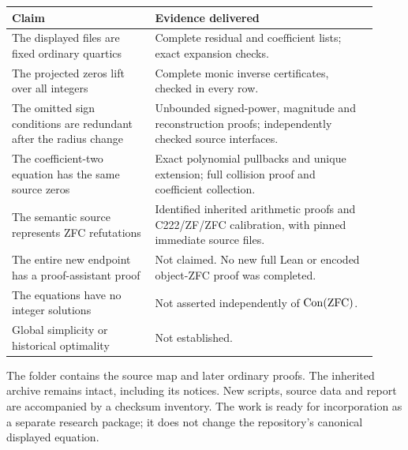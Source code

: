 \begin{center}\small
\begin{tabular}{p{0.36\linewidth}p{0.56\linewidth}}
\toprule
Claim & Evidence delivered\\
\midrule
The displayed files are fixed ordinary quartics & Complete residual and coefficient lists; exact expansion checks.\\
The projected zeros lift over all integers & Complete monic inverse certificates, checked in every row.\\
The omitted sign conditions are redundant after the radius change & Unbounded signed-power, magnitude and reconstruction proofs; independently checked source interfaces.\\
The coefficient-two equation has the same source zeros & Exact polynomial pullbacks and unique extension; full collision proof and coefficient collection.\\
The semantic source represents ZFC refutations & Identified inherited arithmetic proofs and C222/ZF/ZFC calibration, with pinned immediate source files.\\
The entire new endpoint has a proof-assistant proof & Not claimed. No new full Lean or encoded object-ZFC proof was completed.\\
The equations have no integer solutions & Not asserted independently of \(\operatorname{Con}(\mathrm{ZFC})\).\\
Global simplicity or historical optimality & Not established.\\
\bottomrule
\end{tabular}
\end{center}

The folder  contains the source map and later ordinary proofs. The inherited archive remains intact, including its notices. New scripts, source data and report are accompanied by a checksum inventory. The work is ready for incorporation as a separate research package; it does not change the repository's canonical displayed equation.
